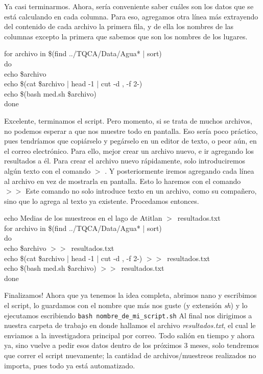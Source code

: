 \documentclass[10pt,letterpaper]{article}
\newcommand{\inlinecode}[1]{
\colorbox{light-gray}{\texttt{#1}}
}
\newenvironment{Code}
{
\begin{lrbox}{\selvestebox}%
\begin{minipage}{\dimexpr\columnwidth-2\fboxsep\relax}
\fontfamily{\ttdefault}\selectfont
}
{\end{minipage}\end{lrbox}%
\begin{center}
\colorbox{light-gray}{\usebox{\selvestebox}}
\end{center}
}
\begin{document}
Ya casi terminarmos. Ahora, ser\'ia conveniente saber cu\'ales son los datos que se est\'a calculando en cada columna. Para eso, agregamos otra l\'inea m\'as extrayendo del contenido de cada archivo la primera fila, y de ella los nombres de las columnas excepto la primera que sabemos que son los nombres de los lugares.

\begin{Code}
for archivo in \$(find ../TQCA/Data/Agua* | sort)\\
do\\
echo \$archivo\\
echo \$(cat \$archivo | head -1 | cut -d , -f 2-)\\
echo \$(bash med.sh \$archivo)\\
done
\end{Code}

Excelente, terminamos el script. Pero momento, si se trata de muchos archivos, no podemos esperar a que nos muestre todo en pantalla. Eso ser\'ia poco pr\'actico, pues tendr\'iamos que copi\'arselo y peg\'arselo en un editor de texto, o peor a\'un, en el correo electr\'onico. Para ello, mejor crear un archivo nuevo, e ir agregando los resultados a \'el. Para crear el archivo nuevo r\'apidamente, solo introduciremos alg\'un texto con el comando \inlinecode{$>$}. Y posteriormente iremos agregando cada l\'inea al archivo en vez de mostrarla en pantalla. Esto lo haremos con el comando \inlinecode{$>>$} Este comando no solo introduce texto en un archivo, como su compa\~nero, sino que lo agrega al texto ya existente. Procedamos entonces.

\begin{Code}
echo Medias de los muestreos en el lago de Atitlan $>$\ resultados.txt\\
for archivo in \$(find ../TQCA/Data/Agua* | sort)\\
do\\
echo \$archivo $>>$\ resultados.txt\\
echo \$(cat \$archivo | head -1 | cut -d , -f 2-) $>>$\ resultados.txt\\
echo \$(bash med.sh \$archivo) $>>$\ resultados.txt\\
done
\end{Code}

Finalizamos! Ahora que ya tenemos la idea completa, abrimos nano y escribimos el script, lo guardamos con el nombre que m\'as nos guste (y extensi\'on \emph{sh}) y lo ejecutamos escribiendo \inlinecode{bash nombre\_de\_mi\_script.sh} Al final nos dirigimos a nuestra carpeta de trabajo en donde hallamos el archivo \emph{resultados.txt}, el cual le enviamos a la investigadora principal por correo. Todo sali\'on en tiempo y ahora ya, sino vuelve a pedir esos datos dentro de los pr\'oximos 3 meses, solo tendremos que correr el script nuevamente; la cantidad de archivos/muestreos realizados no importa, pues todo ya est\'a automatizado.
\end{document}
